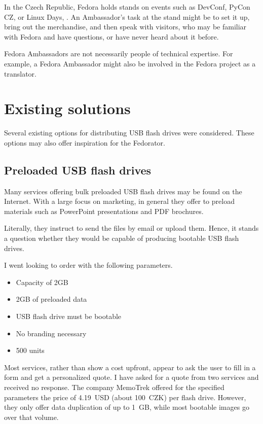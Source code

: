         In the Czech Republic, Fedora holds stands on events such as DevConf\cite{devconf}, PyCon CZ\cite{pycon-cz}, or Linux Days\cite{linux-days}, .  An Ambassador's task at the stand might be to set it up, bring out the merchandise, and then speak with visitors, who may be familiar with Fedora and have questions, or have never heard about it before.
        
        Fedora Ambassadors are not necessarily people of technical expertise.  For example, a Fedora Ambassador might also be involved in the Fedora project as a translator.
    \section{Existing solutions}
        Several existing options for distributing USB flash drives were considered.  These options may also offer inspiration for the Fedorator.
        
        \subsection{Preloaded USB flash drives}
            Many services offering bulk preloaded USB flash drives may be found on the Internet.  With a large focus on marketing, in general they offer to preload materials such as PowerPoint presentations and PDF brochures\cite{flashbay-data-preloading}.
            
            Literally, they instruct to send the files by email or upload them.  Hence, it stands a question whether they would be capable of producing bootable USB flash drives.
            
            I went looking to order with the following parameters.
            \begin{itemize}
                \item Capacity of 2GB
                \item 2GB of preloaded data
                \item USB flash drive must be bootable
                \item No branding necessary
                \item 500 units
            \end{itemize}
            
            Most services, rather than show a cost upfront, appear to ask the user to fill in a form and get a personalized quote\cite{memorysuppliers}\cite{flashbay}\cite{premiumusb}.  I have asked for a quote from two services and received no response.  The company MemoTrek offered for the specified parameters the price of 4.19~USD (about 100~CZK) per flash drive\cite{memotrek-clip-n-easy}.  However, they only offer data duplication of up to 1~GB, while most bootable images go over that volume.
            
